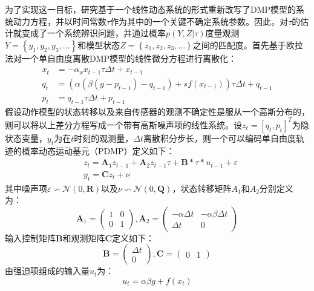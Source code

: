 为了实现这一目标，研究基于一个线性动态系统的形式重新改写了DMP模型的系统动力方程，并以时间常数$τ$作为其中的一个关键不确定系统参数。因此，对$τ$的估计就变成了一个系统辨识问题，并通过概率$p(Y,Z|τ)$度量观测$Y=\left\{y_1,y_2,y_3,...\right\}$和模型状态$Z=\left\{z_1,z_2,z_3,...\right\}$之间的匹配度。首先基于欧拉法对一个单自由度离散DMP模型的线性微分方程进行离散化：
\begin{equation}
    \begin{aligned}
    x_t & =-\alpha_x x_{t-1} \tau \Delta t+x_{t-1} \\
    q_t & =\left(\alpha\left(\beta\left(g-p_{t-1}\right)-q_{t-1}\right)+s f\left(x_{t-1}\right)\right) \tau \Delta t+q_{t-1} \\
    p_t & =q_{t-1} \tau \Delta t+p_{t-1}
    \end{aligned}
    \label{eq:4-11}
\end{equation}
假设动作模型的状态转移以及来自传感器的观测不确定性是服从一个高斯分布的，则可以将以上差分方程写成一个带有高斯噪声项的线性系统。设$z_t = [q_t,p_t]^T$为隐状态变量，$y_t$为在$t$时刻的观测量，$\Delta t$离散积分步长，则一个可以编码单自由度轨迹的概率动态运动基元（PDMP）定义如下：
\begin{equation}
    \begin{aligned}
    & z_t=\mathbf{A}_1 z_{t-1}+\mathbf{A}_2 z_{t-1} \tau+\mathbf{B} * \tau * u_{t-1}+\varepsilon \\
    & y_t=\mathbf{C} z_t+\nu
    \end{aligned}
    \label{eq:4-12}
\end{equation}
其中噪声项$\varepsilon \backsim \mathcal N(0,\mathbf{R})$以及$\nu \backsim \mathcal N(0,\mathbf{Q})$，状态转移矩阵$A_1$和$A_2$分别定义为：
\begin{equation}
    \mathbf{A}_1=\left(\begin{array}{ll}
    1 & 0 \\
    0 & 1
    \end{array}\right), \mathbf{A}_2=\left(\begin{array}{cc}
    -\alpha \Delta t & -\alpha \beta \Delta t \\
    \Delta t & 0
    \end{array}\right)
    \label{eq:4-13}
\end{equation}
输入控制矩阵$\mathbf{B}$和观测矩阵$\mathbf{C}$定义如下：
\begin{equation}
    \mathbf{B}=\left(\begin{array}{c}
    \Delta t \\
    0
    \end{array}\right), \mathbf{C}=\left(\begin{array}{ll}
    0 & 1
    \end{array}\right)
    \label{eq:4-14}
\end{equation}
由强迫项组成的输入量$u_t$为：
\begin{equation}
    u_t=\alpha \beta g+ f\left(x_t\right)
    \label{eq:4-15}
\end{equation}

